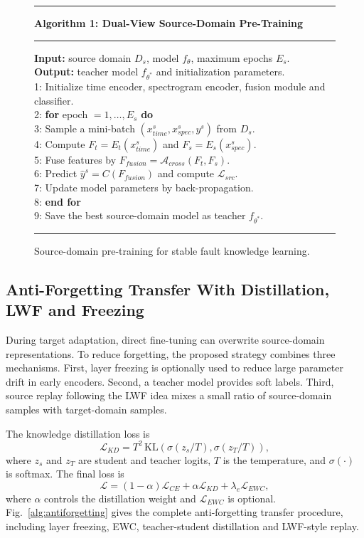 \documentclass[conference,letterpaper]{IEEEtran}\IEEEoverridecommandlockouts
\newcommand{\algorule}{\noindent\rule{\linewidth}{0.6pt}}
\newenvironment{algorithmblock}[1]{%
    \begin{minipage}{0.98\linewidth}
    \algorule\vspace{2pt}
    {\small\textbf{#1}}\par\vspace{2pt}
    \algorule\vspace{2pt}
    \footnotesize
}{%
    \vspace{2pt}\algorule
    \end{minipage}
}
\begin{document}
\begin{figure}[!t]
\centering
\begin{algorithmblock}{Algorithm 1: Dual-View Source-Domain Pre-Training}
\textbf{Input:} source domain $D_s$, model $f_\theta$, maximum epochs $E_s$.\\
\textbf{Output:} teacher model $f_{\theta^*}$ and initialization parameters.\\[1mm]
1: Initialize time encoder, spectrogram encoder, fusion module and classifier.\\
2: \textbf{for} epoch $=1,\ldots,E_s$ \textbf{do}\\
3: \quad Sample a mini-batch $(x_{time}^s,x_{spec}^s,y^s)$ from $D_s$.\\
4: \quad Compute $F_t=E_t(x_{time}^s)$ and $F_s=E_s(x_{spec}^s)$.\\
5: \quad Fuse features by $F_{fusion}=\mathcal{A}_{cross}(F_t,F_s)$.\\
6: \quad Predict $\hat{y}^s=C(F_{fusion})$ and compute $\mathcal{L}_{src}$.\\
7: \quad Update model parameters by back-propagation.\\
8: \textbf{end for}\\
9: Save the best source-domain model as teacher $f_{\theta^*}$.
\end{algorithmblock}
\caption{Source-domain pre-training for stable fault knowledge learning.}
\label{alg:pretrain}
\end{figure}

\subsection{Anti-Forgetting Transfer With Distillation, LWF and Freezing}
During target adaptation, direct fine-tuning can overwrite source-domain representations. To reduce forgetting, the proposed strategy combines three mechanisms. First, layer freezing is optionally used to reduce large parameter drift in early encoders. Second, a teacher model provides soft labels. Third, source replay following the LWF idea mixes a small ratio of source-domain samples with target-domain samples.

The knowledge distillation loss is
\begin{equation}
\mathcal{L}_{KD}=T^2\,\mathrm{KL}\left(\sigma\left(z_s/T\right),\sigma\left(z_T/T\right)\right),
\end{equation}
where $z_s$ and $z_T$ are student and teacher logits, $T$ is the temperature, and $\sigma(\cdot)$ is softmax. The final loss is
\begin{equation}
\mathcal{L}= (1-\alpha)\mathcal{L}_{CE}+\alpha\mathcal{L}_{KD}+\lambda_e\mathcal{L}_{EWC},
\end{equation}
where $\alpha$ controls the distillation weight and $\mathcal{L}_{EWC}$ is optional. Fig.~\ref{alg:antiforgetting} gives the complete anti-forgetting transfer procedure, including layer freezing, EWC, teacher-student distillation and LWF-style replay.
\end{document}

